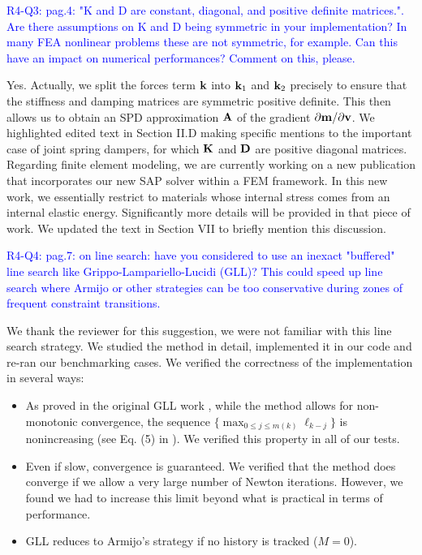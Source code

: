 \vspace{5mm}

\textcolor{blue}{R4-Q3: pag.4: "K and D are constant, diagonal, and positive
definite matrices.". Are there assumptions on K and D being symmetric in your
implementation? In many FEA nonlinear problems these are not symmetric, for
example. Can this have an impact on numerical performances? Comment on this,
please.}

Yes. Actually, we split the forces term ${\mathbf{k}}$ into ${\mathbf{k}}_1$ and ${\mathbf{k}}_2$
precisely to ensure that the stiffness and damping matrices are symmetric
positive definite. This then allows us to obtain an SPD approximation ${\mathbf{A}}$ of
the gradient $\partial {\mathbf{m}}/\partial {\mathbf{v}}$. We highlighted edited text in
Section II.D making specific mentions to the important case of joint spring
dampers, for which ${\mathbf{K}}$ and ${\mathbf{D}}$ are positive diagonal matrices.
Regarding finite element modeling, we are currently working on a new
publication that incorporates our new SAP solver within a FEM framework. In this
new work, we essentially restrict to materials whose internal stress comes from
an internal elastic energy. Significantly more details will be provided in that
piece of work. We updated the text in Section VII to briefly mention this
discussion.

\vspace{5mm}

\textcolor{blue}{R4-Q4: pag.7: on line search: have you considered to use an
inexact "buffered" line search like Grippo-Lampariello-Lucidi (GLL)? This could
speed up line search where Armijo or other strategies can be too conservative
during zones of frequent constraint transitions.}

We thank the reviewer for this suggestion, we were not familiar with this line
search strategy. We studied the method in detail, implemented it in
our code and re-ran our benchmarking cases. We verified the correctness of the
implementation in several ways:
\begin{itemize}
    \item As proved in the original GLL work \cite{bib:grippo1986nonmonotone},
    while the method allows for non-monotonic convergence, the sequence
    $\{\max_{0\leq j \leq m(k)}\ell_{k-j}\}$ is nonincreasing (see Eq. (5) in
    \cite{bib:grippo1986nonmonotone}). We verified this property in all of our
    tests.
    \item Even if slow, convergence is guaranteed. We verified that the method
    does converge if we allow a very large number of Newton iterations. However,
    we found we had to increase this limit beyond what is practical in terms of
    performance.
    \item GLL reduces to Armijo's strategy if no history is tracked ($M=0$).
\end{itemize}

